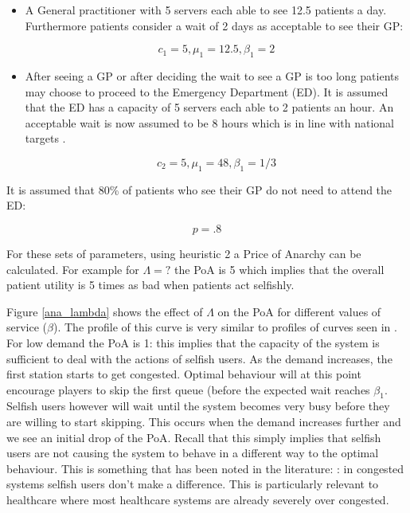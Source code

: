 \documentclass[12pt]{article}
\begin{document}
\begin{itemize}
    \item A General practitioner with 5 servers each able to see 12.5 patients a day. Furthermore patients consider a wait of 2 days as acceptable to see their GP:

        $$c_1=5, \mu_1=12.5, \beta_1=2$$

    \item After seeing a GP or after deciding the wait to see a GP is too long \cite{FINDSOMEPOPNEWSABOUTTHIS} patients may choose to proceed to the Emergency Department (ED). It is assumed that the ED has a capacity of 5 servers each able to 2 patients an hour. An acceptable wait is now assumed to be 8 hours which is in line with national targets \cite{}.

        $$c_2=5, \mu_1=48, \beta_1=1/3$$
\end{itemize}

It is assumed that 80\% of patients who see their GP do not need to attend the ED:

$$p=.8$$

For these sets of parameters, using heuristic 2 a Price of Anarchy can be calculated.
For example for $\Lambda=?$ the PoA is 5 which implies that the overall patient utility is 5 times as bad when patients act selfishly.

Figure \ref{ana_lambda} shows the effect of $\Lambda$ on the PoA for different values of service ($\beta$).
The profile of this curve is very similar to profiles of curves seen in \cite{VKPH}.
For low demand the PoA is 1: this implies that the capacity of the system is sufficient to deal with the actions of selfish users.
As the demand increases, the first station starts to get congested.
Optimal behaviour will at this point encourage players to skip the first queue (before the expected wait reaches $\beta_1$.
Selfish users however will wait until the system becomes very busy before they are willing to start skipping.
This occurs when the demand increases further and we see an initial drop of the PoA.
Recall that this simply implies that selfish users are not causing the system to behave in a different way to the optimal behaviour.
This is something that has been noted in the literature: \cite{bunchofpapers}: in congested systems selfish users don't make a difference.
This is particularly relevant to healthcare where most healthcare systems are already severely over congested.
\end{document}
